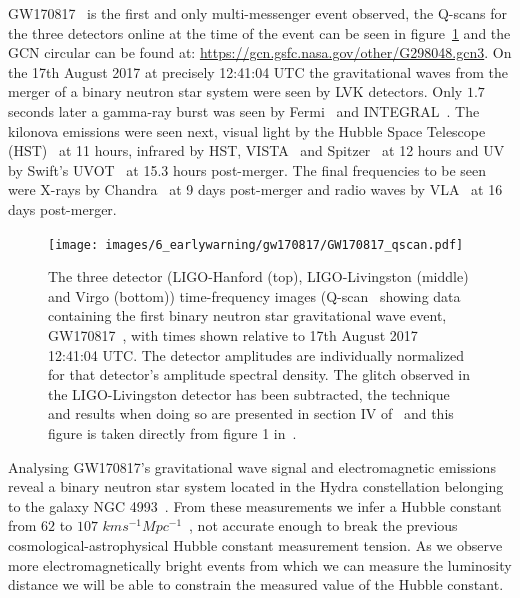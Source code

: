 GW170817~\cite{GW170817:2017} is the first and only multi-messenger event observed, the Q-scans for the three detectors online at the time of the event can be seen in figure~\ref{6:fig:gw170817_qscan} and the GCN circular can be found at: \href{https://gcn.gsfc.nasa.gov/other/G298048.gcn3}{https://gcn.gsfc.nasa.gov/other/G298048.gcn3}. On the 17th August 2017 at precisely 12:41:04 UTC the gravitational waves from the merger of a binary neutron star system were seen by LVK detectors. Only $1.7$ seconds later a gamma-ray burst was seen by Fermi~\cite{Fermi:2022, Fermi_GW170817:2017} and INTEGRAL~\cite{INTEGRAL:2003, INTEGRAL_GW170817:2017}. The kilonova emissions were seen next, visual light by the Hubble Space Telescope (HST)~\cite{HST:2000, HST_GW170817:2021} at 11 hours, infrared by HST, VISTA~\cite{VISTA:2015, VISTA_GW170817:2017} and Spitzer~\cite{Spitzer:2004, Spitzer_GW170817:2018} at 12 hours and UV by Swift's UVOT~\cite{Swift:2004, Swift_GW170817:2017} at 15.3 hours post-merger. The final frequencies to be seen were X-rays by Chandra~\cite{Chandra_GW170817:2017} at 9 days post-merger and radio waves by VLA~\cite{VLA:2019, VLA_GW170817:2017} at 16 days post-merger.
%
\begin{figure}
    \centering
    \texttt{[image: images/6\_earlywarning/gw170817/GW170817\_qscan.pdf]}
    \caption{The three detector (LIGO-Hanford (top), LIGO-Livingston (middle) and Virgo (bottom)) time-frequency images (Q-scan~\cite{qscan:2004} showing data containing the first binary neutron star gravitational wave event, GW170817~\cite{GW170817:2017}, with times shown relative to 17th August 2017 12:41:04 UTC. The detector amplitudes are individually normalized for that detector's amplitude spectral density. The glitch observed in the LIGO-Livingston detector has been subtracted, the technique and results when doing so are presented in section IV of~\cite{GW170817:2017} and this figure is taken directly from figure 1 in~\cite{GW170817:2017}.}
    \label{6:fig:gw170817_qscan}
\end{figure}

Analysing GW170817's gravitational wave signal and electromagnetic emissions reveal a binary neutron star system located in the Hydra constellation belonging to the galaxy NGC 4993~\cite{NGC4993:1998}. From these measurements we infer a Hubble constant from $62$ to $107$ $km s^{-1} Mpc^{-1}$~\cite{GW170817_H0:2017}, not accurate enough to break the previous cosmological-astrophysical Hubble constant measurement tension. As we observe more electromagnetically bright events from which we can measure the luminosity distance we will be able to constrain the measured value of the Hubble constant.

